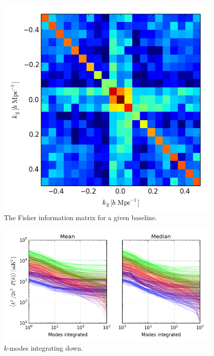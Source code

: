 \documentclass[twocolumn,numberedappendix]{emulateapj} \shorttitle{PSA64}
\begin{document}
\begin{figure}[b!]\centering
\includegraphics[width=\columnwidth, height=\columnwidth]{plots/fisher.png}
\caption{The Fisher information matrix for a given baseline.}
\label{fig:fisher}
\end{figure}


\begin{figure}[t!]\centering
\includegraphics[width=1.8\columnwidth]{plots/pspec_variance.png}
\caption{$k$-modes integrating down.}
\label{fig:pspec_variance}
\end{figure}
\end{document}
